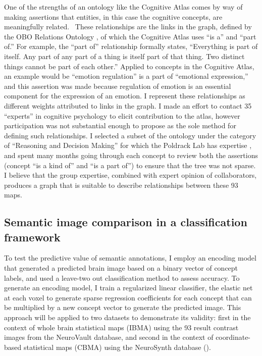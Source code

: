 \documentclass{report}
\begin{document}
One of the strengths of an ontology like the Cognitive Atlas comes by
way of making assertions that entities, in this case the cognitive
concepts, are meaningfully related. ~These relationships are the links
in the graph, defined by the OBO Relations Ontology \cite{Mungall2015-yh},
of which the Cognitive Atlas uses ``is a'' and ``part of.'' For example,
the ``part of'' relationship formally states, ``Everything is part of
itself. Any part of any part of a thing is itself part of that thing.
Two distinct things cannot be part of each other.'' Applied to concepts
in the Cognitive Atlas, an example would be ``emotion regulation'' is a
part of ``emotional expression,'' and this assertion was made because
regulation of emotion is an essential component for the expression of an
emotion. I represent these relationships as different weights attributed
to links in the graph. I made an effort to contact 35 ``experts'' in
cognitive psychology to elicit contribution to the atlas, however
participation was not substantial enough to propose as the sole method
for defining such relationships. I selected a subset of the ontology
under the category of ``Reasoning and Decision Making'' for which the
Poldrack Lab has expertise
\cite{Bissett2012-aq,Bissett2014-td,Bissett2011-of,Bissett2012-yu,Bissett2013-ep,Yamaguchi2012-yn,Poldrack2009-ux,Poldrack2011-jp,Lenartowicz2010-bh,Tom2007-kx,Poldrack1999-cr},
and spent many months going through each concept to review both the
assertions (concept ``is a kind of'' and ``is a part of'') to ensure
that the tree was not sparse. I believe that the group expertise,
combined with expert opinion of collaborators, produces a graph that is
suitable to describe relationships between these 93 maps.

\subsection{Semantic image comparison in a classification framework}
To test the predictive value of semantic annotations, I employ an
encoding model that generated a predicted brain image based on a binary
vector of concept labels, and used a leave-two out classification method
to assess accuracy. To generate an encoding model, I train a regularized
linear classifier, the elastic net
 \cite{noauthor_undated-wy} at
each voxel to generate sparse regression coefficients for each concept
that can be multiplied by a new concept vector to generate the predicted
image. This approach will be applied to two datasets to demonstrate its validity: first in the context of whole brain statistical maps (IBMA) using the 93 result contrast images from the NeuroVault database, and second in the context of coordinate-based statistical maps (CBMA) using the NeuroSynth database (\cite{Yarkoni2011-rg}).
\end{document}
